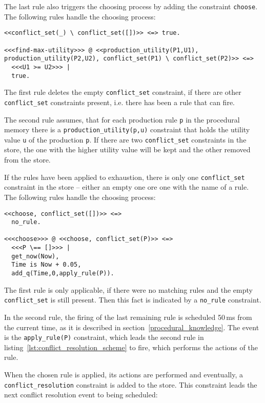 The last rule also triggers the choosing process by adding the constraint \lstinline|choose|. The following rules handle the choosing process:

\begin{lstlisting}
<<conflict_set(_) \ conflict_set([])>> <=> true.
  
<<<find-max-utility>>> @ <<production_utility(P1,U1), production_utility(P2,U2), conflict_set(P1) \ conflict_set(P2)>> <=>
  <<<U1 >= U2>>> |
  true.
\end{lstlisting}

The first rule deletes the empty \lstinline|conflict_set| constraint, if there are other \lstinline|conflict_set| constraints present, i.e. there has been a rule that can fire.

The second rule assumes, that for each production rule \lstinline|p| in the procedural memory there is a \lstinline|production_utility(p,u)| constraint that holds the utility value \lstinline|u| of the production \lstinline|p|. If there are two \lstinline|conflict_set| constraints in the store, the one with the higher utility value will be kept and the other removed from the store.

If the rules have been applied to exhaustion, there is only one \lstinline|conflict_set| constraint in the store -- either an empty one ore one with the name of a rule. The following rules handle the choosing process:

\begin{lstlisting}
<<choose, conflict_set([])>> <=>
  no_rule.

<<<choose>>> @ <<choose, conflict_set(P)>> <=>
  <<<P \== []>>> |
  get_now(Now),
  Time is Now + 0.05,
  add_q(Time,0,apply_rule(P)). 
\end{lstlisting}

The first rule is only applicable, if there were no matching rules and the empty \lstinline|conflict_set| is still present. Then this fact is indicated by a \lstinline|no_rule| constraint.

In the second rule, the firing of the last remaining rule is scheduled 50\,ms from the current time, as it is described in section~\ref{procedural_knowledge}. The event is the \lstinline|apply_rule(P)| constraint, which leads the second rule in listing~\ref{lst:conflict_resolution_scheme} to fire, which performs the actions of the rule.

When the chosen rule is applied, its actions are performed and eventually, a \lstinline|conflict_resolution| constraint is added to the store. This constraint leads the next conflict resolution event to being scheduled:

